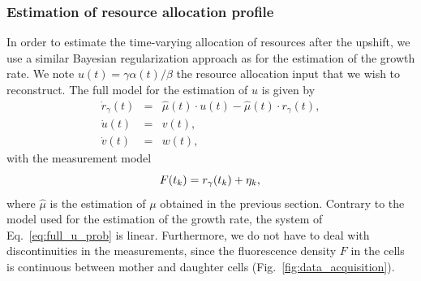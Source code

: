 \subsubsection*{Estimation of resource allocation profile}

In order to estimate the time-varying allocation of resources after the upshift, we use a similar Bayesian regularization approach as for the estimation of the growth rate.
We note $u(t) = \gamma \alpha (t) / \beta$ the resource allocation input that we wish to reconstruct.
The full model for the estimation of $u$ is given by
\begin{eqnarray}
\dot{r}_\gamma(t) &=& \hat{\mu} (t) \cdot u (t) - \hat{\mu} (t) \cdot r_\gamma (t), \nonumber\\
\dot{u}(t) &=& v(t),\label{eq:full_u_prob}\\
\dot{v}(t) &=& w(t),\nonumber
\end{eqnarray}
with the measurement model
\begin{equation*}
F(t_k) = r_\gamma (t_k) + \eta_k,\\
\end{equation*}
where $\hat{\mu}$ is the estimation of $\mu$ obtained in the previous section.
Contrary to the model used for the estimation of the growth rate, the system of Eq.~\ref{eq:full_u_prob} is linear.
Furthermore, we do not have to deal with discontinuities in the measurements, since the fluorescence density $F$ in the cells is continuous between mother and daughter cells (Fig.~\ref{fig:data_acquisition}).

